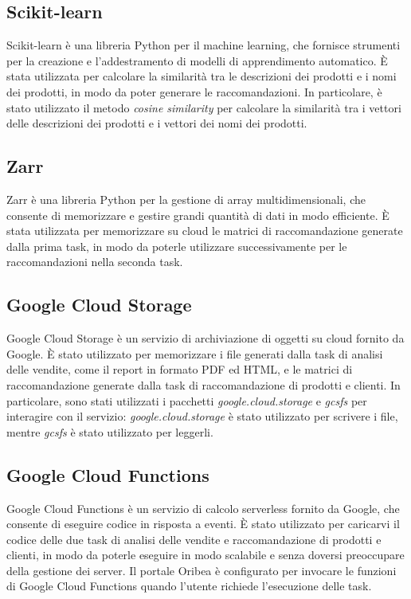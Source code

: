 \subsection{Scikit-learn}
Scikit-learn è una libreria Python per il machine learning, che fornisce strumenti per la creazione e l'addestramento di modelli di apprendimento automatico. È stata utilizzata per calcolare la similarità tra le descrizioni dei prodotti e i nomi dei prodotti, in modo da poter generare le raccomandazioni. In particolare, è stato utilizzato il metodo \emph{cosine similarity} per calcolare la similarità tra i vettori delle descrizioni dei prodotti e i vettori dei nomi dei prodotti.

\subsection{Zarr}
Zarr è una libreria Python per la gestione di array multidimensionali, che consente di memorizzare e gestire grandi quantità di dati in modo efficiente. È stata utilizzata per memorizzare su cloud le matrici di raccomandazione generate dalla prima task, in modo da poterle utilizzare successivamente per le raccomandazioni nella seconda task.

\subsection{Google Cloud Storage}
Google Cloud Storage è un servizio di archiviazione di oggetti su cloud fornito da Google. È stato utilizzato per memorizzare i file generati dalla task di analisi delle vendite, come il report in formato PDF ed HTML, e le matrici di raccomandazione generate dalla task di raccomandazione di prodotti e clienti. In particolare, sono stati utilizzati i pacchetti \emph{google.cloud.storage} e \emph{gcsfs} per interagire con il servizio: \emph{google.cloud.storage} è stato utilizzato per scrivere i file, mentre \emph{gcsfs} è stato utilizzato per leggerli.

\subsection{Google Cloud Functions}
Google Cloud Functions è un servizio di calcolo serverless fornito da Google, che consente di eseguire codice in risposta a eventi. È stato utilizzato per caricarvi il codice delle due task di analisi delle vendite e raccomandazione di prodotti e clienti, in modo da poterle eseguire in modo scalabile e senza doversi preoccupare della gestione dei server. Il portale Oribea è configurato per invocare le funzioni di Google Cloud Functions quando l'utente richiede l'esecuzione delle task.

